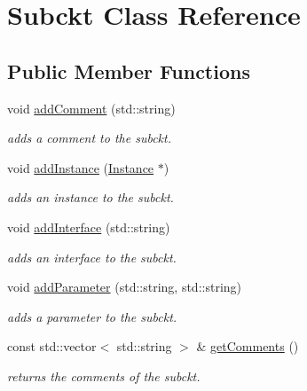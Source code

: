 \hypertarget{class_s_p_i_c_e_1_1_subckt}{}\section{Subckt Class Reference}
\label{class_s_p_i_c_e_1_1_subckt}
\subsection*{Public Member Functions}
\begin{DoxyCompactItemize}
\item 
void \hyperlink{class_s_p_i_c_e_1_1_subckt_a6c590c1d92248d6e5f95ea6c470fbb5a}{add\+Comment} (std\+::string)
\begin{DoxyCompactList}\small\item\em adds a comment to the subckt. \end{DoxyCompactList}\item 
void \hyperlink{class_s_p_i_c_e_1_1_subckt_a7bb4a4532643568ab1ac2c229185a88e}{add\+Instance} (\hyperlink{class_s_p_i_c_e_1_1_instance}{Instance} $\ast$)
\begin{DoxyCompactList}\small\item\em adds an instance to the subckt. \end{DoxyCompactList}\item 
void \hyperlink{class_s_p_i_c_e_1_1_subckt_ac162264683fa3d9b3384d3e8cc291fa2}{add\+Interface} (std\+::string)
\begin{DoxyCompactList}\small\item\em adds an interface to the subckt. \end{DoxyCompactList}\item 
void \hyperlink{class_s_p_i_c_e_1_1_subckt_ab3ab147a16bc490ce96db905a4ca271c}{add\+Parameter} (std\+::string, std\+::string)
\begin{DoxyCompactList}\small\item\em adds a parameter to the subckt. \end{DoxyCompactList}\item 
const std\+::vector$<$ std\+::string $>$ \& \hyperlink{class_s_p_i_c_e_1_1_subckt_aa4a73ef909ceb8d442ed2f205967613a}{get\+Comments} ()
\begin{DoxyCompactList}\small\item\em returns the comments of the subckt. \end{DoxyCompactList}\item 
\mbox{\label{class_s_p_i_c_e_1_1_subckt_a8e6e58ffab876152a740092520c35d73}} 

\end{DoxyCompactItemize}
